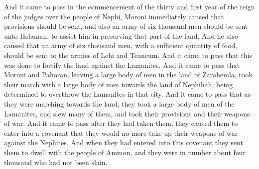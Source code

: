 And it came to pass in the commencement of the thirty and first year of the reign of the judges over the people of Nephi, Moroni immediately caused that provisions should be sent, and also an army of six thousand men should be sent unto Helaman, to assist him in preserving that part of the land.
\bverse \iffalse And he also caused that an army of six thousand men, with a sufficient quantity of food, should be sent to the armies of Lehi and Teancum. And it came to pass that this was done to fortify the land against the Lamanites. \fi
And he also caused that an army of six thousand men, with a sufficient quantity of food, should be sent to the armies of Lehi and Teancum. And it came to pass that this was done to fortify the land against the Lamanites.
\bverse \iffalse And it came to pass that Moroni and Pahoran, leaving a large body of men in the land of Zarahemla, took their march with a large body of men towards the land of Nephihah, being determined to overthrow the Lamanites in that city. \fi
And it came to pass that Moroni and Pahoran, leaving a large body of men in the land of Zarahemla, took their march with a large body of men towards the land of Nephihah, being determined to overthrow the Lamanites in that city.
\bverse \iffalse And it came to pass that as they were marching towards the land, they took a large body of men of the Lamanites, and slew many of them, and took their provisions and their weapons of war. \fi
And it came to pass that as they were marching towards the land, they took a large body of men of the Lamanites, and slew many of them, and took their provisions and their weapons of war.
\bverse \iffalse And it came to pass after they had taken them, they caused them to enter into a covenant that they would no more take up their weapons of war against the Nephites. \fi
And it came to pass after they had taken them, they caused them to enter into a covenant that they would no more take up their weapons of war against the Nephites.
\bverse \iffalse And when they had entered into this covenant they sent them to dwell with the people of Ammon, and they were in number about four thousand who had not been slain. \fi
And when they had entered into this covenant they sent them to dwell with the people of Ammon, and they were in number about four thousand who had not been slain.
\bverse \iffalse And it came to pass that when they had sent them away they pursued their march towards the land of Nephihah. And it came to pass that when they had come to the city of Nephihah, they did pitch their tents in the plains of Nephihah, which is near the city of Nephihah. \fi
